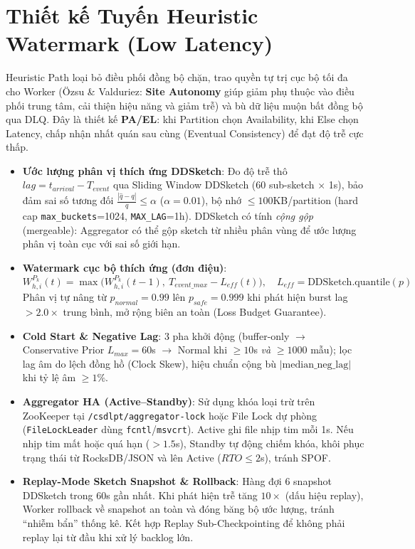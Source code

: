 \documentclass[9pt,a4paper]{article}
\begin{document}
\section{Thiết kế Tuyến Heuristic Watermark (Low Latency)}
Heuristic Path loại bỏ điều phối đồng bộ chặn, trao quyền tự trị cục bộ tối đa cho Worker (Özsu \& Valduriez: \textbf{Site Autonomy} giúp giảm phụ thuộc vào điều phối trung tâm, cải thiện hiệu năng và giảm trễ) và bù dữ liệu muộn bất đồng bộ qua DLQ. Đây là thiết kế \textbf{PA/EL}: khi Partition chọn Availability, khi Else chọn Latency, chấp nhận nhất quán sau cùng (Eventual Consistency) để đạt độ trễ cực thấp.

\begin{itemize}[leftmargin=*]
    \item \textbf{Ước lượng phân vị thích ứng DDSketch}: Đo độ trễ thô $lag=t_{arrival}-T_{event}$ qua Sliding Window DDSketch (60 sub-sketch $\times$ 1s), bảo đảm sai số tương đối $\frac{|\hat q-q|}{q}\le\alpha$ ($\alpha=0.01$), bộ nhớ $\le 100$KB/partition (hard cap \texttt{max\_buckets}=1024, \texttt{MAX\_LAG}=1h). DDSketch có tính \emph{cộng gộp} (mergeable): Aggregator có thể gộp sketch từ nhiều phân vùng để ước lượng phân vị toàn cục với sai số giới hạn.
    \item \textbf{Watermark cục bộ thích ứng (đơn điệu)}:
    {\large
    \begin{equation}
    \boxed{W_{h,i}^{P_k}(t) = \max\Big(W_{h,i}^{P_k}(t{-}1),\ T_{event\_max} - L_{eff}(t)\Big),\quad L_{eff}=\text{DDSketch.quantile}(p)}
    \end{equation}
    }
    Phân vị tự nâng từ $p_{normal}=0.99$ lên $p_{safe}=0.999$ khi phát hiện burst lag $>2.0\times$ trung bình, mở rộng biên an toàn (Loss Budget Guarantee).
    \item \textbf{Cold Start \& Negative Lag}: 3 pha khởi động (buffer-only $\to$ Conservative Prior $L_{max}=60$s $\to$ Normal khi $\ge 10$s \emph{và} $\ge 1000$ mẫu); lọc lag âm do lệch đồng hồ (Clock Skew), hiệu chuẩn cộng bù $|\text{median\_neg\_lag}|$ khi tỷ lệ âm $\ge 1\%$.
    \item \textbf{Aggregator HA (Active--Standby)}: Sử dụng khóa loại trừ trên ZooKeeper tại \texttt{/csdlpt/aggregator-lock} hoặc File Lock dự phòng (\texttt{FileLockLeader} dùng \texttt{fcntl}/\texttt{msvcrt}). Active ghi file nhịp tim mỗi 1s. Nếu nhịp tim mất hoặc quá hạn ($>1.5$s), Standby tự động chiếm khóa, khôi phục trạng thái từ RocksDB/JSON và lên Active ($RTO\le 2$s), tránh SPOF.
    \item \textbf{Replay-Mode Sketch Snapshot \& Rollback}: Hàng đợi 6 snapshot DDSketch trong 60s gần nhất. Khi phát hiện trễ tăng $10\times$ (dấu hiệu replay), Worker rollback về snapshot an toàn và đóng băng bộ ước lượng, tránh ``nhiễm bẩn'' thống kê. Kết hợp Replay Sub-Checkpointing để không phải replay lại từ đầu khi xử lý backlog lớn.

\end{itemize}
\end{document}
